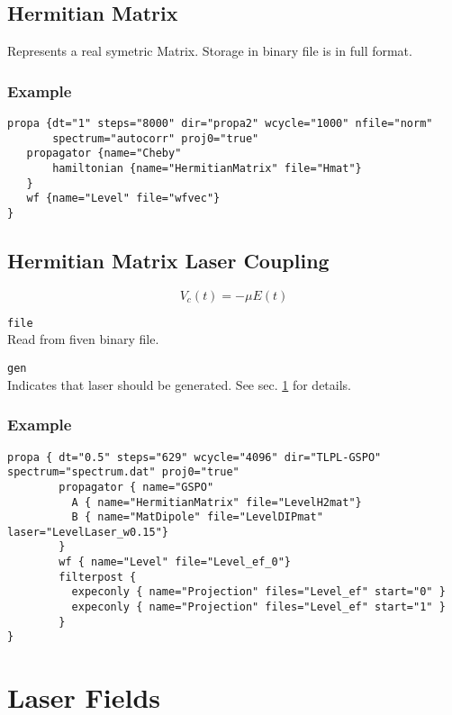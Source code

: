\documentclass[a4paper,12pt]{scrbook}
\newcommand{\option}[2]{\item \texttt{#1}\\ #2}
\begin{document}
\subsection{Hermitian Matrix}
Represents a real symetric Matrix.
Storage in binary file is in full format.

\subsubsection*{Example}
\begin{verbatim}
propa {dt="1" steps="8000" dir="propa2" wcycle="1000" nfile="norm"
       spectrum="autocorr" proj0="true"
   propagator {name="Cheby"
       hamiltonian {name="HermitianMatrix" file="Hmat"}
   }
   wf {name="Level" file="wfvec"}
}
\end{verbatim}


\subsection{Hermitian Matrix Laser Coupling}
\begin{equation}
 V_c(t) = -\mu E(t)
\end{equation}

\begin{options}
 \option{file}{Read from fiven binary file.}
 \option{gen}{Indicates that laser should be generated. See sec. \ref{sec:LaserFields} for details.}
\end{options}

\subsubsection*{Example}
\begin{verbatim}
propa { dt="0.5" steps="629" wcycle="4096" dir="TLPL-GSPO" spectrum="spectrum.dat" proj0="true"
        propagator { name="GSPO"
          A { name="HermitianMatrix" file="LevelH2mat"}
          B { name="MatDipole" file="LevelDIPmat" laser="LevelLaser_w0.15"}
        }
        wf { name="Level" file="Level_ef_0"}
        filterpost {
          expeconly { name="Projection" files="Level_ef" start="0" }
          expeconly { name="Projection" files="Level_ef" start="1" }
        }
}
\end{verbatim}

\section{Laser Fields}
\label{sec:LaserFields}
\end{document}
